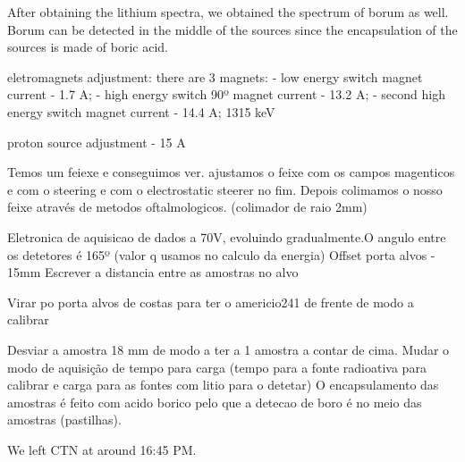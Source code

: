 \documentclass{article}
\begin{document}
After obtaining the lithium spectra, we obtained the spectrum of borum as well. Borum can be detected in the middle of the sources since the encapsulation of the sources is made of boric acid. 



eletromagnets adjustment: there are 3 magnets:
- low energy switch magnet current - 1.7 A;
- high energy switch 90º magnet current - 13.2 A;
- second high energy switch magnet current - 14.4 A;
1315 keV

proton source adjustment - 15 A 

Temos um feiexe e conseguimos ver. ajustamos o feixe com os campos magenticos e com o steering e com o electrostatic steerer no fim. Depois colimamos o nosso feixe através de metodos oftalmologicos. (colimador de raio 2mm)

Eletronica de aquisicao de dados a 70V, evoluindo gradualmente.O angulo entre os detetores é 165º (valor q usamos no calculo da energia)
Offset porta alvos - 15mm
Escrever a distancia entre as amostras no alvo

Virar po porta alvos de costas para ter o americio241 de frente de modo a calibrar

Desviar a amostra 18 mm de modo a ter a 1 amostra a contar de cima. Mudar o modo de aquisição de tempo para carga (tempo para a fonte radioativa para calibrar e carga para as fontes com litio para o detetar)
O encapsulamento das amostras é feito com acido borico pelo que a detecao de boro é no meio das amostras (pastilhas).

We left CTN at around 16:45 PM.



\printbibliography
\nocite{*}
\end{document}
